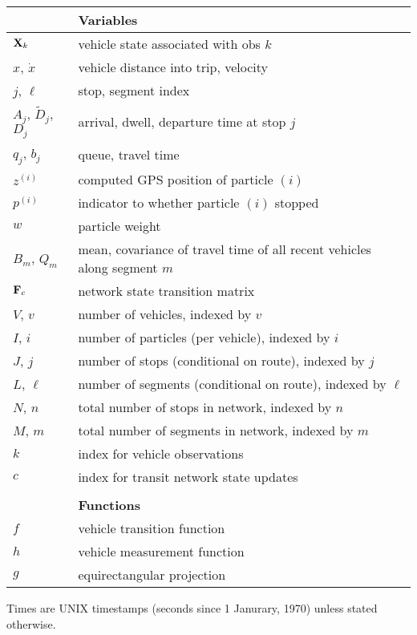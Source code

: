 \documentclass[draftcls,a4paper,onecolumn]{IEEEtran}\usepackage[]{graphicx}\usepackage[]{color}
\begin{document}
\begin{xtabular}{ll}
  &\textbf{Variables} \\ \midrule
  $\mathbf{X}_k$ & vehicle state associated with obs $k$ \\
  $x$, $\dot x$ & vehicle distance into trip, velocity \\
  $j$, $\ell$ & stop, segment index \\
  $A_j$, $\tilde D_j$, $D_j$ & arrival, dwell, departure time at stop $j$ \\
  $q_j$, $b_j$ & queue, travel time \\
  $z^{(i)}$ & computed GPS position of particle $(i)$ \\
  $p^{(i)}$ & indicator to whether particle $(i)$ stopped \\
  $w$ & particle weight \\
  $B_m$, $Q_m$ & mean, covariance of travel time of all recent vehicles along segment $m$ \\
  $\mathbf{F}_c$ & network state transition matrix \\
  $V$, $v$ & number of vehicles, indexed by $v$ \\
  $I$, $i$ & number of particles (per vehicle), indexed by $i$ \\
  $J$, $j$ & number of stops (conditional on route), indexed by $j$ \\
  $L$, $\ell$ & number of segments (conditional on route), indexed by $\ell$ \\
  $N$, $n$ & total number of stops in network, indexed by $n$ \\
  $M$, $m$ & total number of segments in network, indexed by $m$ \\
  $k$ & index for vehicle observations \\
  $c$ & index for transit network state updates \\
  \bottomrule
  \\ \toprule
  &\textbf{Functions} \\ \midrule
  $f$ & vehicle transition function \\
  $h$ & vehicle measurement function \\
  $g$ & equirectangular projection \\
  \bottomrule
\end{xtabular}
  


\vspace{1em}
Times are UNIX timestamps (seconds since 1 Janurary, 1970) unless stated otherwise.
\end{document}
